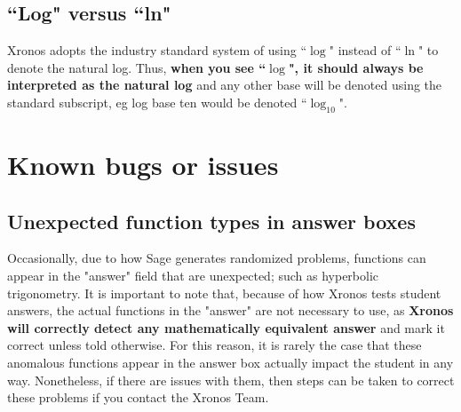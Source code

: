 \documentclass{article}
\begin{document}
\subsection{``Log" versus ``ln"}
Xronos adopts the industry standard system of using ``$\log$" instead of ``$\ln$" to denote the natural log. Thus, \textbf{when you see ``$\log$", it should always be interpreted as the natural log} and any other base will be denoted using the standard subscript, eg log base ten would be denoted ``$\log_{10}$".




\section{Known bugs or issues}

\subsection{Unexpected function types in answer boxes}
Occasionally, due to how Sage generates randomized problems, functions can appear in the "answer" field that are unexpected; such as hyperbolic trigonometry. It is important to note that, because of how Xronos tests student answers, the actual functions in the "answer" are not necessary to use, as \textbf{Xronos will correctly detect any mathematically equivalent answer} and mark it correct unless told otherwise. For this reason, it is rarely the case that these anomalous functions appear in the answer box actually impact the student in any way. Nonetheless, if there are issues with them, then steps can be taken to correct these problems if you contact the Xronos Team.
\end{document}
